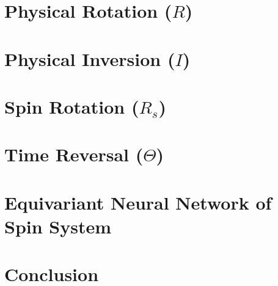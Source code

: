 \documentclass[reprint, 10pt]{revtex4-2}
\begin{document}
\section{Physical Rotation ($R$)}


\section{Physical Inversion ($I$)}


\section{Spin Rotation ($R_s$)}


\section{Time Reversal ($\Theta$)}


\section{Equivariant Neural Network of Spin System}


\section{Conclusion}
\end{document}
